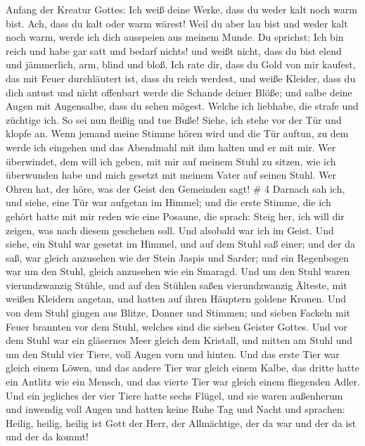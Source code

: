 Anfang der Kreatur Gottes:  Ich weiß deine Werke, dass du
weder kalt noch warm bist. Ach, dass du kalt oder warm wärest!
 Weil du aber lau bist und weder kalt noch warm, werde ich
dich ausspeien aus meinem Munde.  Du sprichst: Ich bin
reich und habe gar satt und bedarf nichts! und weißt nicht, dass du bist
elend und jämmerlich, arm, blind und bloß.  Ich rate dir,
dass du Gold von mir kaufest, das mit Feuer durchläutert ist, dass du
reich werdest, und weiße Kleider, dass du dich antust und nicht
offenbart werde die Schande deiner Blöße; und salbe deine Augen mit
Augensalbe, dass du sehen mögest.  Welche ich liebhabe, die
strafe und züchtige ich. So sei nun fleißig und tue Buße! 
Siehe, ich stehe vor der Tür und klopfe an. Wenn jemand meine Stimme
hören wird und die Tür auftun, zu dem werde ich eingehen und das
Abendmahl mit ihm halten und er mit mir.  Wer überwindet,
dem will ich geben, mit mir auf meinem Stuhl zu sitzen, wie ich
überwunden habe und mich gesetzt mit meinem Vater auf seinen Stuhl.
 Wer Ohren hat, der höre, was der Geist den Gemeinden sagt!
\# 4  Darnach sah ich, und siehe, eine Tür war aufgetan im
Himmel; und die erste Stimme, die ich gehört hatte mit mir reden wie
eine Posaune, die sprach: Steig her, ich will dir zeigen, was nach
diesem geschehen soll.  Und alsobald war ich im Geist. Und
siehe, ein Stuhl war gesetzt im Himmel, und auf dem Stuhl saß einer;
 und der da saß, war gleich anzusehen wie der Stein Jaspis
und Sarder; und ein Regenbogen war um den Stuhl, gleich anzusehen wie
ein Smaragd.  Und um den Stuhl waren vierundzwanzig Stühle,
und auf den Stühlen saßen vierundzwanzig Älteste, mit weißen Kleidern
angetan, und hatten auf ihren Häuptern goldene Kronen.  Und
von dem Stuhl gingen aus Blitze, Donner und Stimmen; und sieben Fackeln
mit Feuer brannten vor dem Stuhl, welches sind die sieben Geister
Gottes.  Und vor dem Stuhl war ein gläsernes Meer gleich dem
Kristall, und mitten am Stuhl und um den Stuhl vier Tiere, voll Augen
vorn und hinten.  Und das erste Tier war gleich einem Löwen,
und das andere Tier war gleich einem Kalbe, das dritte hatte ein Antlitz
wie ein Mensch, und das vierte Tier war gleich einem fliegenden Adler.
 Und ein jegliches der vier Tiere hatte sechs Flügel, und
sie waren außenherum und inwendig voll Augen und hatten keine Ruhe Tag
und Nacht und sprachen: Heilig, heilig, heilig ist Gott der Herr, der
Allmächtige, der da war und der da ist und der da kommt! 
